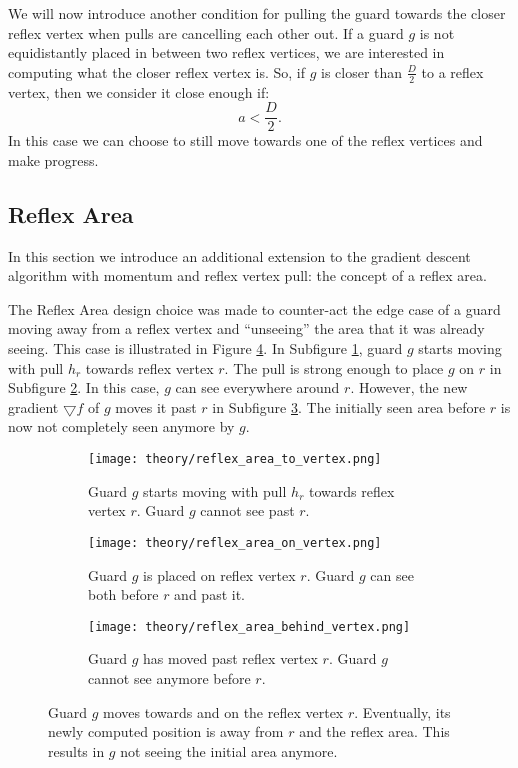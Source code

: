We will now introduce another condition for pulling the guard towards the closer reflex vertex when pulls are cancelling each other out. If a guard $g$ is not equidistantly placed in between two reflex vertices, we are interested in computing what the closer reflex vertex is. So, if $g$ is closer than $\frac D 2$ to a reflex vertex, then we consider it close enough if: $$a < \frac D 2.$$
In this case we can choose to still move towards one of the reflex vertices and make progress.



\subsection{Reflex Area}
In this section we introduce an additional extension to the gradient descent algorithm with momentum and reflex vertex pull: the concept of a reflex area. 

The Reflex Area design choice was made to counter-act the edge case of a guard moving away from a reflex vertex and ``unseeing'' the area that it was already seeing. This case is illustrated in Figure \ref{fig:pull_to_on_behind}. In Subfigure \ref{fig:pull_to_on_behind1}, guard $g$ starts moving with pull $h_r$ towards reflex vertex $r$. The pull is strong enough to place $g$ on $r$ in Subfigure \ref{fig:pull_to_on_behind2}. In this case, $g$ can see everywhere around $r$. However, the new gradient $\bigtriangledown f$ of $g$ moves it past $r$ in Subfigure \ref{fig:pull_to_on_behind3}. The initially seen area before $r$ is now not completely seen anymore by $g$.

\begin{figure}[h!]
    \centering
    \begin{subfigure}{0.45\textwidth}
        \texttt{[image: theory/reflex\_area\_to\_vertex.png]}
        \caption{Guard $g$ starts moving with pull $h_r$ towards reflex vertex $r$. Guard $g$ cannot see past $r$.}
        \label{fig:pull_to_on_behind1}
    \end{subfigure}
    \hfill
    \begin{subfigure}{0.45\textwidth}
        \texttt{[image: theory/reflex\_area\_on\_vertex.png]}
        \caption{Guard $g$ is placed on reflex vertex $r$. Guard $g$ can see both before $r$ and past it.}
        \label{fig:pull_to_on_behind2}
    \end{subfigure}
    \begin{subfigure}{0.6\textwidth}
        \texttt{[image: theory/reflex\_area\_behind\_vertex.png]}
        \caption{Guard $g$ has moved past reflex vertex $r$. Guard $g$ cannot see anymore before $r$.}
        \label{fig:pull_to_on_behind3}
    \end{subfigure}
    \caption{Guard $g$ moves towards and on the reflex vertex $r$. Eventually, its newly computed position is away from $r$ and the reflex area. This results in $g$ not seeing the initial area anymore.}
    \label{fig:pull_to_on_behind}
\end{figure}


